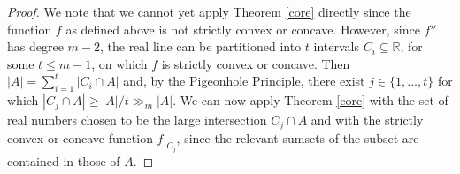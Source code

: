 \documentclass[11pt]{amsart}
\newcommand{\R}{\mathbb{R}}
\newtheorem{corollary}[theorem]{Corollary}
\begin{document}
\begin{proof}
    We note that we cannot yet apply Theorem \ref{core} directly since the function $f$ as defined above is not strictly convex or concave. However, since $f''$ has degree $m-2$, the real line can be partitioned into $t$ intervals $C_i\subseteq\R$, for some $t\le m-1$, on which $f$ is strictly convex or concave. Then $|A|=\sum_{i=1}^t|C_i\cap A|$ and, by the Pigeonhole Principle, there exist $j\in\{1,\dotsc,t\}$ for which $|C_j\cap A|\ge|A|/t\gg_m|A|.$ We can now apply Theorem \ref{core} with the set of real numbers chosen to be the large intersection $C_j\cap A$ and with the strictly convex or concave function $f\big|_{C_j}$, since the relevant sumsets of the subset are contained in those of $A.$
\end{proof}

\end{document}
